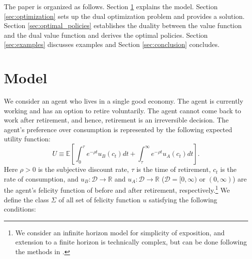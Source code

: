 \documentclass[a4paper,report, 11pt]{article}
\begin{document}
The paper is organized as follows. Section \ref{sec:model} explains the model. 
Section \ref{sec:optimization} sets up the dual optimization problem and provides a solution. Section \ref{sec:optimal_policies} establishes the duality between the value function and the dual value function and derives the optimal policies. Section \ref{sec:examples} discusses examples and Section \ref{sec:conclusion} concludes.






\section{Model}\label{sec:model}

We consider an agent who lives in a single good economy. The agent is currently working and has an option to retire voluntarily. The agent cannot come  back to work after retirement, and hence,  retirement is an irreversible decision. The agent's preference over consumption is represented by the following expected utility function:
	\begin{equation}\label{eq:utility}
	U\equiv \mathbb{E}\left[\int_0^\tau e^{-\rho t} u_B(c_t)dt+\int_\tau^\infty e^{-\rho t}u_A(c_t)dt\right].
\end{equation}
Here $\rho >0$ is the subjective discount rate, $\tau$ is the time of retirement, $c_t$ is the rate of consumption, and $u_B: {\mathcal D}\rightarrow \mathbb{R}$ and $u_A: {\mathcal D}\rightarrow \mathbb{R}$ (${\mathcal D}= [0,\infty)$ or $(0,\infty)$) are the agent's felicity function of before and after retirement, respectively.\footnote{  We consider an infinite horizon model for simplicity of exposition, and extension to a finite horizon is technically complex, but can be done following the methods in \citet{YK}.
}
We define the class $\Sigma$ of all set of felicity function $u$ satisfying the following conditions:
\end{document}

